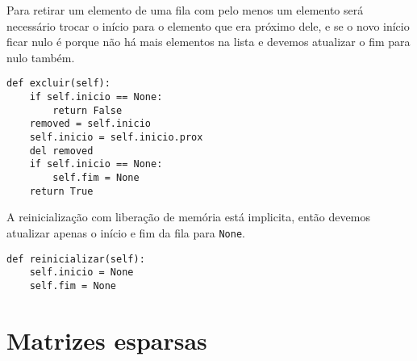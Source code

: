 \documentclass[a4paper, twocolumn]{article}
\theoremstyle{definition}
\begin{document}
Para retirar um elemento de uma fila com pelo menos um elemento será necessário trocar o início para o elemento que era próximo dele, e se o novo início ficar nulo é porque não há mais elementos na lista e devemos atualizar o fim para nulo também.
\begin{lstlisting}[label=fila_din_excluir, caption= Fila dinâmica (remoção)]
def excluir(self):
    if self.inicio == None:
        return False
    removed = self.inicio
    self.inicio = self.inicio.prox
    del removed
    if self.inicio == None:
        self.fim = None
    return True
\end{lstlisting}

A reinicialização com liberação de memória está implicita, então devemos atualizar apenas o início e fim da fila para \texttt{None}.
\begin{lstlisting}[label=fila_din_reiniciar, caption= Fila dinâmica (reinicialização)]
def reinicializar(self):
    self.inicio = None
    self.fim = None
\end{lstlisting}

\section{Matrizes esparsas}
\end{document}
